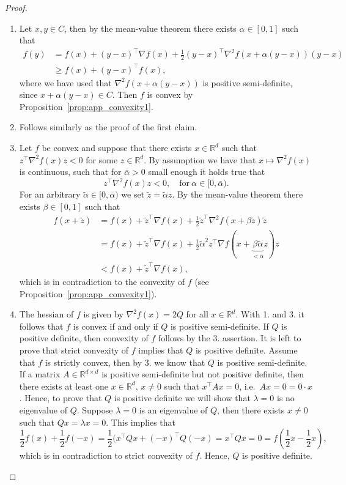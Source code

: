 \documentclass[12pt,openany]{book}
\theoremstyle{definition}
\theoremstyle{definition}
\newcommand{\R}{\mathbb{R}}
\begin{document}
\begin{proof}
\begin{enumerate}
\item Let $x,y\in C$, then by the mean-value theorem there exists $\alpha\in[0,1]$ such that
\begin{align*}
f(y) &= f(x) + (y-x)^\top \nabla f(x) + \frac{1}{2} (y-x)^\top \nabla^2 f(x+\alpha (y-x))(y-x)\\ &\ge f(x) + (y-x)^\top f(x),
\end{align*}
where we have used that $ \nabla^2 f(x+\alpha (y-x))$ is positive semi-definite, since $x+\alpha(y-x)\in C$. Then $f$ is convex by Proposition~\ref{prop:app_convexity1}.
\item Follows similarly as the proof of the first claim. 
\item Let $f$ be convex and suppose that there exists $x\in\R^d$ such that $z^\top \nabla^2 f(x) z <0$ for some $z\in\R^d$. By assumption we have that $x\mapsto \nabla^2 f(x)$ is continuous, such that for $\bar\alpha>0$ small enough it holds true that
\[z^\top \nabla^2f(x) z<0,\quad \text{for}\ \alpha \in [0,\bar\alpha). \]
For an arbitrary $\tilde \alpha\in[0,\bar\alpha)$ we set $\tilde z = \tilde \alpha z$. By the mean-value theorem there exists $\beta\in[0,1]$ such that
\begin{align*}
f(x+\tilde z) &= f(x) + \tilde z^\top \nabla f(x)+ \frac{1}{2} \tilde z^\top \nabla^2 f(x+ \beta \tilde z) \tilde z\\
&= f(x) + \tilde z^\top \nabla f(x)+\frac12 \tilde\alpha^2 z^\top \nabla f(x+\underbrace{\beta\tilde\alpha}_{<\bar\alpha} z)z\\
&< f(x) + \tilde z^\top \nabla f(x),
\end{align*}
which is in contradiction to the convexity of $f$ (see Proposition~\ref{prop:app_convexity1}).
\item The hessian of $f$ is given by $\nabla^2 f(x) = 2Q$ for all $x\in\R^d$. With 1. and 3. it follows that $f$ is convex if and only if $Q$ is positive semi-definite.  If $Q$ is positive definite, then convexity of $f$ follows by the 3. assertion.  It is left to prove that strict convexity of $f$ implies that $Q$ is positive definite. Assume that $f$ is strictly convex, then by 3. we know that $Q$ is positive semi-definite.  If a matrix $A\in\R^{d\times d}$ is positive semi-definite but not positive definite, then there exists at least one $x\in\R^d$, $x\neq 0$ such that $x^\top A x = 0$, i.e.~$Ax = 0 = 0\cdot x$. Hence, to prove that $Q$ is positive definite we will show that $\lambda = 0$ is no eigenvalue of $Q$. Suppose $\lambda = 0$ is an eigenvalue of $Q$, then there exists $x\neq 0$ such that $Qx = \lambda x = 0$. This implies that
\[\frac12 f(x) + \frac12 f(-x) = \frac12(x^\top Q x + (-x)^\top Q (-x) = x^\top Q x = 0 = f(\frac12 x-\frac12 x), \]
which is in contradiction to strict convexity of $f$.  Hence, $Q$ is positive definite. 
\end{enumerate}
\end{proof}
\end{document}
